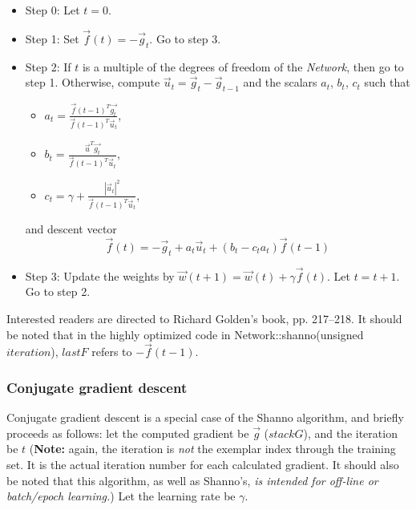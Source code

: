 \documentclass{report}
\begin{document}
\begin{itemize}
\item Step 0: Let $t=0$.
\item Step 1: Set $\vec{f}(t)=-\vec{g}_t$.  Go to step 3.
\item Step 2: If $t$ is a multiple of the degrees of freedom of the
      {\em Network}, then go to step 1.  Otherwise, compute
      $\vec{u}_t=\vec{g}_t-\vec{g}_{t-1}$ and the scalars $a_t$,
      $b_t$, $c_t$ such that
\begin{itemize}
\item $a_t=\frac{\vec{f}(t-1)^T\vec{g_t}}{\vec{f}(t-1)^T\vec{u}_t}$,
\item $b_t=\frac{\vec{u}^T\vec{g_t}}{\vec{f}(t-1)^T\vec{u}_t}$,
\item $c_t=\gamma+\frac{|\vec{u}_t|^2}{\vec{f}(t-1)^T\vec{u}_t}$,
\end{itemize}
and descent vector
\begin{displaymath}
\vec{f}(t)=-\vec{g}_t+a_t\vec{u}_t+(b_t-c_ta_t)\vec{f}(t-1)
\end{displaymath}
\item Step 3: Update the weights by
$\vec{w}(t+1)=\vec{w}(t)+\gamma\vec{f}(t)$.
Let $t=t+1$.  Go to step 2.
\end{itemize}

Interested readers are directed to Richard Golden's book, pp.
217--218. It should be noted that in the highly optimized code in
Network::shanno(unsigned $iteration$), $lastF$ refers to
$-\vec{f}(t-1)$.

\subsubsection{Conjugate gradient descent}

Conjugate gradient descent is a special case of the Shanno algorithm,
and briefly proceeds as follows: let the computed gradient be
$\vec{g}$ ($stackG$), and the iteration be $t$ ({\bf Note:} again, the
iteration is {\em not} the exemplar index through the training set. It
is the actual iteration number for each calculated gradient.  It
should also be noted that this algorithm, as well as Shanno's, {\em is
intended for off-line or batch/epoch learning.}) Let the learning rate
be $\gamma$.
\end{document}

